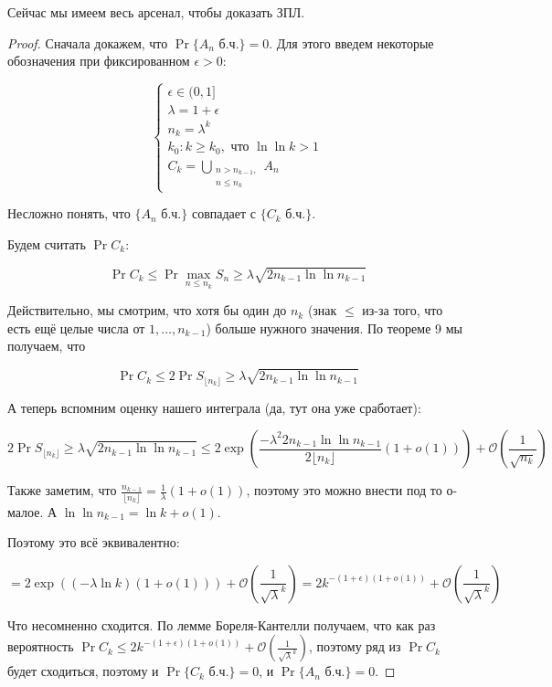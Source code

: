 Сейчас мы имеем весь арсенал, чтобы доказать ЗПЛ.

\begin{proof}
  Сначала докажем, что $\Pr{\{\text{$A_n$ б.ч.}\}} = 0$. Для этого введем некоторые
  обозначения при фиксированном $\epsilon > 0$:

  \[
    \begin{cases}
      \epsilon \in (0, 1]\\
      \lambda = 1 + \epsilon\\
      n_k = \lambda^k\\
      k_0: k \geq k_0, \text{ что } \ln\ln k > 1\\
      C_k = \bigcup\limits_{\substack{n > n_{k - 1},\\n \leq n_k}} A_n
    \end{cases}
  \]

  Несложно понять, что $\{A_n\text{ б.ч.}\}$ совпадает с $\{C_k\text{ б.ч.}\}$.

  Будем считать $\Pr{C_k}$:

  \[
    \Pr{C_k} \leq \Pr{\max\limits_{n \leq n_k} S_n \geq \lambda\sqrt{2n_{k - 1}\ln\ln n_{k - 1}}}
  \]

  Действительно, мы смотрим, что хотя бы один до $n_k$ (знак $\leq$ из-за того,
  что есть ещё целые числа от $1,\ldots,n_{k - 1}$) больше нужного значения.
  По теореме 9 мы получаем, что

  \[
    \Pr{C_k} \leq 2\Pr{S_{\lfloor n_k\rfloor} \geq \lambda\sqrt{2n_{k - 1}\ln\ln n_{k - 1}}}
  \]

  А теперь вспомним оценку нашего интеграла (да, тут она уже сработает):

  \[
    2\Pr{S_{\lfloor n_k\rfloor} \geq \lambda\sqrt{2n_{k - 1}\ln\ln n_{k - 1}}}
    \leq 2\exp\left(\frac{-\lambda^2 2 n_{k - 1}\ln\ln n_{k - 1}}{2\lfloor n_k\rfloor}(1 + o(1))\right)
    + \mathcal{O}\left(\frac{1}{\sqrt{n_k}}\right)
  \]

  Также заметим, что $\frac{n_{k - 1}}{\lfloor n_k \rfloor} = \frac{1}{\lambda}(1 + o(1))$,
  поэтому это можно внести под то о-малое. А $\ln\ln n_{k - 1} = \ln k + o(1)$.

  Поэтому это всё эквивалентно:

  \[
    = 2\exp\left((-\lambda \ln k)(1 + o(1))\right)
    + \mathcal{O}\left(\frac{1}{\sqrt{\lambda}^k}\right) = 
    2 k^{-(1 + \epsilon)(1 + o(1))} 
    + \mathcal{O}\left(\frac{1}{\sqrt{\lambda}^k}\right)
  \]

  Что несомненно сходится. По лемме Бореля-Кантелли получаем, что как раз
  вероятность $\Pr{C_k} \leqslant  2 k^{-(1 + \epsilon)(1 + o(1))} 
  + \mathcal{O}\left(\frac{1}{\sqrt{\lambda}^k}\right)$, поэтому ряд
  из $\Pr{C_k}$ будет сходиться, поэтому и  $\Pr{\{C_k\text{ б.ч.}\}} = 0$,
  и $\Pr{\{A_n\text{ б.ч.}\}} = 0$.


\end{proof}
